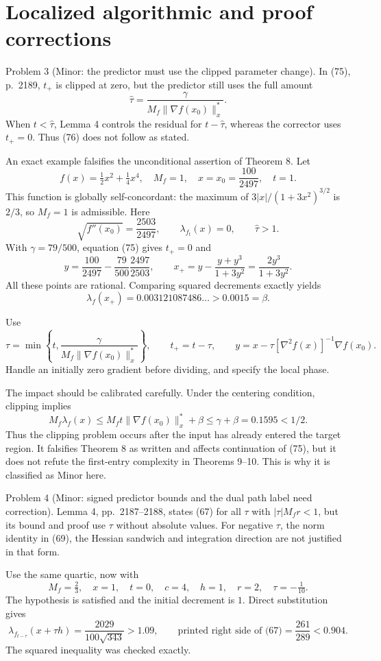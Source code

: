 \documentclass[10pt]{article}
\begin{document}
\section*{Localized algorithmic and proof corrections}
Problem 3 (Minor: the predictor must use the clipped parameter change).  In (75), p. 2189, \(t_+\) is clipped at zero, but the predictor still uses the full amount \[\widehat\tau=\frac{\gamma}{M_f\|\nabla f(x_0)\|_x^\ast}.\] When \(t<\widehat\tau\), Lemma 4 controls the residual for \(t-\widehat\tau\), whereas the corrector uses \(t_+=0\). Thus (76) does not follow as stated.\par
An exact example falsifies the unconditional assertion of Theorem 8. Let \[f(x)=\tfrac12x^2+\tfrac14x^4,\quad M_f=1,\quad
 x=x_0=\frac{100}{2497},\quad t=1.\] This function is globally self-concordant: the maximum of \(3|x|/(1+3x^2)^{3/2}\) is \(2/3\), so \(M_f=1\) is admissible. Here \[\sqrt{f''(x_0)}=\frac{2503}{2497},\qquad
 \lambda_{f_t}(x)=0,\qquad \widehat\tau>1.\] With \(\gamma=79/500\), equation (75) gives \(t_+=0\) and \[y=\frac{100}{2497}-\frac{79}{500}\frac{2497}{2503},
 \qquad
 x_+=y-\frac{y+y^3}{1+3y^2}=\frac{2y^3}{1+3y^2}.\] All these points are rational. Comparing squared decrements exactly yields \[\lambda_f(x_+)=0.003121087486\ldots>0.0015=\beta.\]\par
Use \[\tau=\min\!\left\{t,\frac{\gamma}{M_f\|\nabla f(x_0)\|_x^\ast}\right\},
 \qquad t_+=t-\tau,\qquad
 y=x-\tau[\nabla^2f(x)]^{-1}\nabla f(x_0).\] Handle an initially zero gradient before dividing, and specify the local phase.\par
The impact should be calibrated carefully. Under the centering condition, clipping implies \[M_f\lambda_f(x)
 \leq M_f t\|\nabla f(x_0)\|_x^\ast+\beta
 \leq\gamma+\beta=0.1595<1/2.\] Thus the clipping problem occurs after the input has already entered the target region. It falsifies Theorem 8 as written and affects continuation of (75), but it does not refute the first-entry complexity in Theorems 9–10. This is why it is classified as Minor here.\par
Problem 4 (Minor: signed predictor bounds and the dual path label need correction).  Lemma 4, pp. 2187–2188, states (67) for all \(\tau\) with \(|\tau|M_fr<1\), but its bound and proof use \(\tau\) without absolute values. For negative \(\tau\), the norm identity in (69), the Hessian sandwich and integration direction are not justified in that form.\par
Use the same quartic, now with \[M_f=\tfrac23,\quad x=1,\quad t=0,\quad c=4,\quad
 h=1,\quad r=2,\quad \tau=-\tfrac1{10}.\] The hypothesis is satisfied and the initial decrement is \(1\). Direct substitution gives \[\lambda_{f_{t-\tau}}(x+\tau h)
 =\frac{2029}{100\sqrt{343}}>1.09,
 \qquad
 \text{printed right side of (67)}=\frac{261}{289}<0.904.\] The squared inequality was checked exactly.\par
\end{document}
